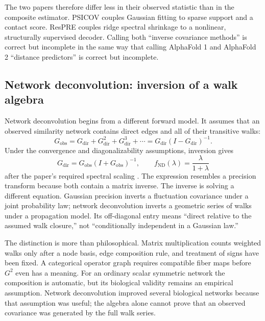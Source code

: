 The two papers therefore differ less in their observed statistic than in the composite estimator.
PSICOV couples Gaussian fitting to sparse support and a contact score.  ResPRE couples ridge
spectral shrinkage to a nonlinear, structurally supervised decoder.  Calling both ``inverse
covariance methods'' is correct but incomplete in the same way that calling AlphaFold 1 and
AlphaFold 2 ``distance predictors'' is correct but incomplete.

\subsection{Network deconvolution: inversion of a walk algebra}

Network deconvolution begins from a different forward model.  It assumes that an observed
similarity network contains direct edges and all of their transitive walks:
\begin{equation}
G_{\mathrm{obs}}
=G_{\mathrm{dir}}+G_{\mathrm{dir}}^2+G_{\mathrm{dir}}^3+\cdots
=G_{\mathrm{dir}}(I-G_{\mathrm{dir}})^{-1}.
\label{eq:network-deconvolution-forward}
\end{equation}
Under the convergence and diagonalizability assumptions, inversion gives
\begin{equation}
G_{\mathrm{dir}}
=G_{\mathrm{obs}}(I+G_{\mathrm{obs}})^{-1},
\qquad
f_{\mathrm{ND}}(\lambda)=\frac{\lambda}{1+\lambda}
\label{eq:network-deconvolution-filter}
\end{equation}
after the paper's required spectral scaling \cite{feizi2013}.  The expression resembles a
precision transform because both contain a matrix inverse.  The inverse is solving a different
equation.  Gaussian precision inverts a fluctuation covariance under a joint probability law;
network deconvolution inverts a geometric series of walks under a propagation model.  Its
off-diagonal entry means ``direct relative to the assumed walk closure,'' not ``conditionally
independent in a Gaussian law.''

The distinction is more than philosophical.  Matrix multiplication counts weighted walks only
after a node basis, edge composition rule, and treatment of signs have been fixed.  A categorical
operator graph requires compatible fiber maps before $G^2$ even has a meaning.  For an ordinary
scalar symmetric network the composition is automatic, but its biological validity remains an
empirical assumption.  Network deconvolution improved several biological networks because that
assumption was useful; the algebra alone cannot prove that an observed covariance was generated
by the full walk series.

